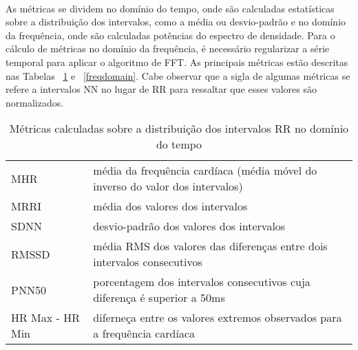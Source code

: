             \paragraph{} As métricas se dividem no domínio do tempo, onde são calculadas estatísticas sobre a distribuição dos intervalos, como a média ou desvio-padrão e no domínio da frequência, onde são calculadas potências do espectro de densidade. Para o cálculo de métricas no domínio da frequência, é necessário regularizar a série temporal para aplicar o algoritmo de FFT. As principais métricas estão descritas nas Tabelas ~\ref{timedomain} e ~\ref{freqdomain}.  Cabe observar que a sigla de algumas métricas se refere a intervalos NN no lugar de RR para ressaltar que esses valores são normalizados.

            \begin{table}[ht!]
                \centering
                \caption{Métricas calculadas sobre a  distribuição dos intervalos RR no domínio do tempo}
                \label{timedomain}
                \begin{tabular}{l | p{8cm}}
                MHR & média da frequência cardíaca (média móvel do inverso do valor dos intervalos) \\
                MRRI  & média dos valores dos intervalos                             \\
                SDNN  & desvio-padrão dos valores dos intervalos                     \\
                RMSSD & média RMS dos valores das diferenças entre dois intervalos consecutivos \\
                PNN50 & porcentagem dos intervalos consecutivos cuja diferença é
                superior a 50ms \\
                HR Max - HR Min & diferneça entre os valores extremos observados para a frequência cardíaca \\
                \end{tabular}
            \end{table}

